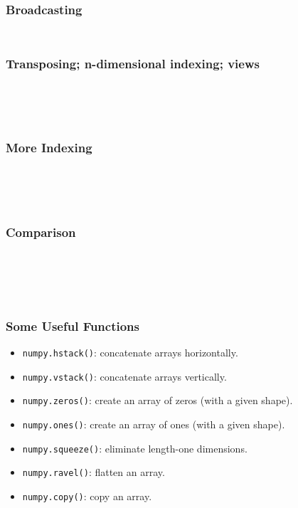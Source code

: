 \documentclass{beamer}
\begin{document}
\begin{frame}[fragile]
  \frametitle{Broadcasting}
  \inputminted[firstline=24,lastline=28]{pycon}{code/broadcasting.txt}
  \codepause
  \inputminted[firstline=29,lastline=33]{pycon}{code/broadcasting.txt}
\end{frame}

\begin{frame}[fragile]
  \frametitle{Transposing; n-dimensional indexing; views}
  \inputminted[firstline=1,lastline=4]{pycon}{code/transpose.txt}
  \codepause
  \inputminted[firstline=5,lastline=8]{pycon}{code/transpose.txt}
  \codepause
  \inputminted[firstline=9,lastline=12]{pycon}{code/transpose.txt}
  \codepause
  \inputminted[firstline=13,lastline=13]{pycon}{code/transpose.txt}
  \codepause
  \inputminted[firstline=14,lastline=16]{pycon}{code/transpose.txt}
\end{frame}

\begin{frame}[fragile]
  \frametitle{More Indexing}
  \inputminted[firstline=1,lastline=5]{pycon}{code/indexing.txt}
  \codepause
  \inputminted[firstline=6,lastline=7]{pycon}{code/indexing.txt}
  \codepause
  \inputminted[firstline=8,lastline=9]{pycon}{code/indexing.txt}
  \codepause
  \inputminted[firstline=10,lastline=12]{pycon}{code/indexing.txt}
  \codepause
  \inputminted[firstline=13,lastline=14]{pycon}{code/indexing.txt}
\end{frame}

\begin{frame}[fragile]
  \frametitle{Comparison}
  \inputminted[firstline=1,lastline=4]{pycon}{code/comparison.txt}
  \codepause
  \inputminted[firstline=5,lastline=5]{pycon}{code/comparison.txt}
  \codepause
  \inputminted[firstline=6,lastline=8]{pycon}{code/comparison.txt}
  \codepause
  \inputminted[firstline=9,lastline=10]{pycon}{code/comparison.txt}
  \codepause
  \inputminted[firstline=11,lastline=11]{pycon}{code/comparison.txt}
  \codepause
  \inputminted[firstline=12,lastline=15]{pycon}{code/comparison.txt}
\end{frame}

\begin{frame}
  \frametitle{Some Useful Functions}
  \begin{itemize}
  \item \texttt{numpy.hstack()}: concatenate arrays horizontally.
  \item \texttt{numpy.vstack()}: concatenate arrays vertically.
  \item \texttt{numpy.zeros()}: create an array of zeros (with a given shape).
  \item \texttt{numpy.ones()}: create an array of ones (with a given shape).
  \item \texttt{numpy.squeeze()}: eliminate length-one dimensions.
  \item \texttt{numpy.ravel()}: flatten an array.
  \item \texttt{numpy.copy()}: copy an array.
  \end{itemize}
\end{frame}
\end{document}
